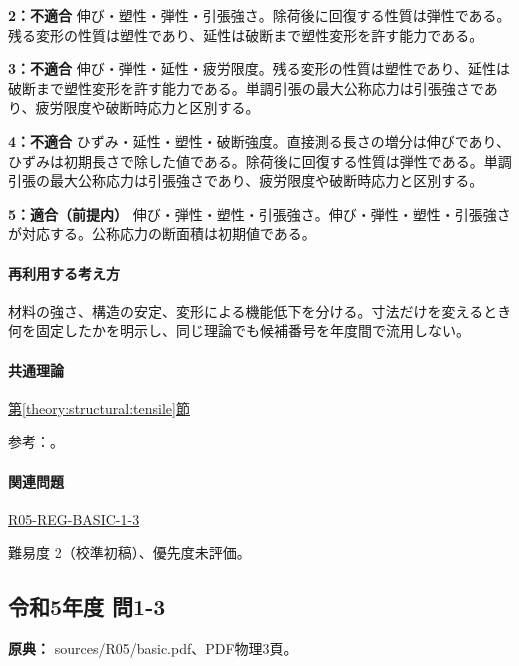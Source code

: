 \noindent\textbf{2：不適合} 伸び・塑性・弾性・引張強さ。除荷後に回復する性質は弾性である。残る変形の性質は塑性であり、延性は破断まで塑性変形を許す能力である。\par

\noindent\textbf{3：不適合} 伸び・弾性・延性・疲労限度。残る変形の性質は塑性であり、延性は破断まで塑性変形を許す能力である。単調引張の最大公称応力は引張強さであり、疲労限度や破断時応力と区別する。\par

\noindent\textbf{4：不適合} ひずみ・延性・塑性・破断強度。直接測る長さの増分は伸びであり、ひずみは初期長さで除した値である。除荷後に回復する性質は弾性である。単調引張の最大公称応力は引張強さであり、疲労限度や破断時応力と区別する。\par

\noindent\textbf{5：適合（前提内）} 伸び・弾性・塑性・引張強さ。伸び・弾性・塑性・引張強さが対応する。公称応力の断面積は初期値である。\par

\paragraph{再利用する考え方} 材料の強さ、構造の安定、変形による機能低下を分ける。寸法だけを変えるとき何を固定したかを明示し、同じ理論でも候補番号を年度間で流用しない。

\paragraph{共通理論} \hyperref[theory:structural:tensile]{第\ref*{theory:structural:tensile}節}

\par 参考：\cite{struct_mit_beam,struct_mit_buckling,struct_mlit_limit}。

\paragraph{関連問題} \hyperref[q:r05-reg-basic-1-3]{R05-REG-BASIC-1-3}

\par 難易度 2（校準初稿）、優先度未評価。

\subsection{令和5年度 問1-3}
\label{q:r05-reg-basic-1-3}

\noindent\textbf{原典：} sources/R05/basic.pdf、PDF物理3頁。

